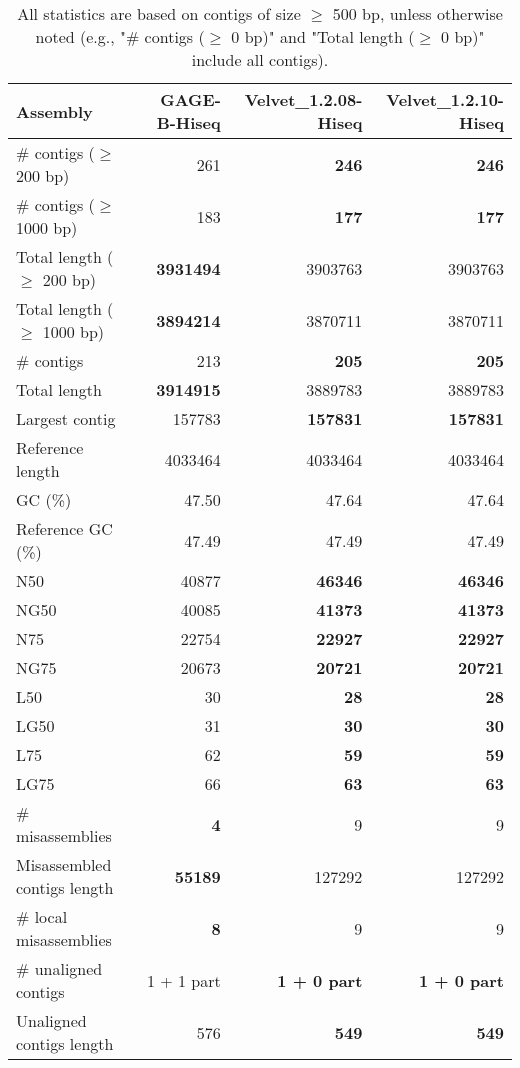 \documentclass[12pt,a4paper]{article}
\begin{document}
\begin{table}[ht]
\begin{center}
\caption{All statistics are based on contigs of size $\geq$ 500 bp, unless otherwise noted (e.g., "\# contigs ($\geq$ 0 bp)" and "Total length ($\geq$ 0 bp)" include all contigs).}
\begin{tabular}{|l*{3}{|r}|}
\hline
Assembly & GAGE-B-Hiseq & Velvet\_1.2.08-Hiseq & Velvet\_1.2.10-Hiseq \\ \hline
\# contigs ($\geq$ 200 bp) & 261 & {\bf 246} & {\bf 246} \\ \hline
\# contigs ($\geq$ 1000 bp) & 183 & {\bf 177} & {\bf 177} \\ \hline
Total length ($\geq$ 200 bp) & {\bf 3931494} & 3903763 & 3903763 \\ \hline
Total length ($\geq$ 1000 bp) & {\bf 3894214} & 3870711 & 3870711 \\ \hline
\# contigs & 213 & {\bf 205} & {\bf 205} \\ \hline
Total length & {\bf 3914915} & 3889783 & 3889783 \\ \hline
Largest contig & 157783 & {\bf 157831} & {\bf 157831} \\ \hline
Reference length & 4033464 & 4033464 & 4033464 \\ \hline
GC (\%) & 47.50 & 47.64 & 47.64 \\ \hline
Reference GC (\%) & 47.49 & 47.49 & 47.49 \\ \hline
N50 & 40877 & {\bf 46346} & {\bf 46346} \\ \hline
NG50 & 40085 & {\bf 41373} & {\bf 41373} \\ \hline
N75 & 22754 & {\bf 22927} & {\bf 22927} \\ \hline
NG75 & 20673 & {\bf 20721} & {\bf 20721} \\ \hline
L50 & 30 & {\bf 28} & {\bf 28} \\ \hline
LG50 & 31 & {\bf 30} & {\bf 30} \\ \hline
L75 & 62 & {\bf 59} & {\bf 59} \\ \hline
LG75 & 66 & {\bf 63} & {\bf 63} \\ \hline
\# misassemblies & {\bf 4} & 9 & 9 \\ \hline
Misassembled contigs length & {\bf 55189} & 127292 & 127292 \\ \hline
\# local misassemblies & {\bf 8} & 9 & 9 \\ \hline
\# unaligned contigs & 1 + 1 part & {\bf 1 + 0 part} & {\bf 1 + 0 part} \\ \hline
Unaligned contigs length & 576 & {\bf 549} & {\bf 549} \\ \hline

\end{tabular}
\end{center}
\end{table}
\end{document}
